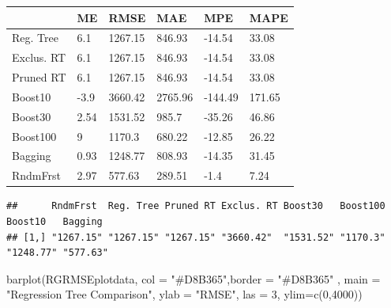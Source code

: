 \documentclass[
]{article}
\newenvironment{Shaded}{\begin{snugshade}}{\end{snugshade}}
\newcommand{\AttributeTok}[1]{\textcolor[rgb]{0.77,0.63,0.00}{#1}}
\newcommand{\ConstantTok}[1]{\textcolor[rgb]{0.00,0.00,0.00}{#1}}
\newcommand{\DecValTok}[1]{\textcolor[rgb]{0.00,0.00,0.81}{#1}}
\newcommand{\FunctionTok}[1]{\textcolor[rgb]{0.00,0.00,0.00}{#1}}
\newcommand{\NormalTok}[1]{#1}
\newcommand{\OtherTok}[1]{\textcolor[rgb]{0.56,0.35,0.01}{#1}}
\newcommand{\SpecialCharTok}[1]{\textcolor[rgb]{0.00,0.00,0.00}{#1}}
\newcommand{\StringTok}[1]{\textcolor[rgb]{0.31,0.60,0.02}{#1}}
\begin{document}
\begin{table}
\centering
\begin{tabu} to 
\hline
  & ME & RMSE & MAE & MPE & MAPE\\
\hline
Reg. Tree & 6.1 & 1267.15 & 846.93 & -14.54 & 33.08\\
\hline
Exclus. RT & 6.1 & 1267.15 & 846.93 & -14.54 & 33.08\\
\hline
Pruned RT & 6.1 & 1267.15 & 846.93 & -14.54 & 33.08\\
\hline
Boost10 & -3.9 & 3660.42 & 2765.96 & -144.49 & 171.65\\
\hline
Boost30 & 2.54 & 1531.52 & 985.7 & -35.26 & 46.86\\
\hline
Boost100 & 9 & 1170.3 & 680.22 & -12.85 & 26.22\\
\hline
Bagging & 0.93 & 1248.77 & 808.93 & -14.35 & 31.45\\
\hline
RndmFrst & 2.97 & 577.63 & 289.51 & -1.4 & 7.24\\
\hline
\end{tabu}
\end{table}

\begin{Shaded}
\end{Shaded}

\begin{verbatim}
##      RndmFrst  Reg. Tree Pruned RT Exclus. RT Boost30   Boost100 Boost10   Bagging
## [1,] "1267.15" "1267.15" "1267.15" "3660.42"  "1531.52" "1170.3" "1248.77" "577.63"
\end{verbatim}

\begin{Shaded}
\begin{Highlighting}[]
\FunctionTok{barplot}\NormalTok{(RGRMSEplotdata, }\AttributeTok{col =} \StringTok{"\#D8B365"}\NormalTok{,}\AttributeTok{border =} \StringTok{"\#D8B365"}\NormalTok{ ,}
         \AttributeTok{main =} \StringTok{"Regression Tree Comparison"}\NormalTok{, }\AttributeTok{ylab =} \StringTok{"RMSE"}\NormalTok{, }\AttributeTok{las =} \DecValTok{3}\NormalTok{, }\AttributeTok{ylim=}\FunctionTok{c}\NormalTok{(}\DecValTok{0}\NormalTok{,}\DecValTok{4000}\NormalTok{))}
\end{Highlighting}
\end{Shaded}
\end{document}

